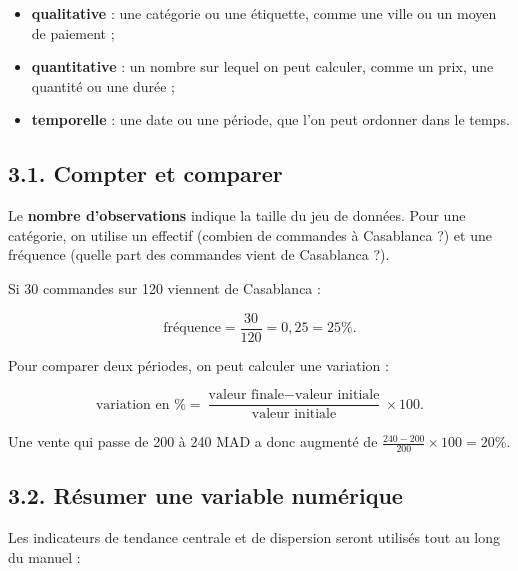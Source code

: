 \documentclass[
  french,
  letterpaper,
  open=any]{scrbook}
\providecommand{\tightlist}{%
  \setlength{\itemsep}{0pt}\setlength{\parskip}{0pt}}
\theoremstyle{definition}
\theoremstyle{definition}
\theoremstyle{remark}
\begin{document}
\begin{itemize}
\tightlist
\item
  \textbf{qualitative} : une catégorie ou une étiquette, comme une ville
  ou un moyen de paiement ;
\item
  \textbf{quantitative} : un nombre sur lequel on peut calculer, comme
  un prix, une quantité ou une durée ;
\item
  \textbf{temporelle} : une date ou une période, que l'on peut ordonner
  dans le temps.
\end{itemize}

\subsection{3.1. Compter et comparer}\label{compter-et-comparer}

Le \textbf{nombre d'observations} indique la taille du jeu de données.
Pour une catégorie, on utilise un effectif (combien de commandes à
Casablanca ?) et une fréquence (quelle part des commandes vient de
Casablanca ?).

Si 30 commandes sur 120 viennent de Casablanca :

\[
\text{fréquence} = \frac{30}{120} = 0{,}25 = 25\%.
\]

Pour comparer deux périodes, on peut calculer une variation :

\[
\text{variation en \%} =
\frac{\text{valeur finale} - \text{valeur initiale}}
{\text{valeur initiale}}\times 100.
\]

Une vente qui passe de 200 à 240 MAD a donc augmenté de
\(\frac{240-200}{200}\times 100=20\%\).

\subsection{3.2. Résumer une variable
numérique}\label{ruxe9sumer-une-variable-numuxe9rique}

Les indicateurs de tendance centrale et de dispersion seront utilisés
tout au long du manuel :
\end{document}
